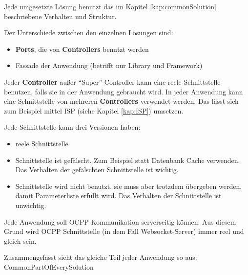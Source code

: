 Jede umgesetzte Lösung benutzt das im Kapitel \ref{kap:commonSolution} beschriebene Verhalten und Struktur. 

Der Unterschiede zwischen den einzelnen Lösungen sind:
\begin{itemize}
    \item \textbf{Ports}, die von \textbf{Controllers} benutzt werden
    \item Fassade der Anwendung (betrifft nur Library und Framework)
\end{itemize}

Jeder \textbf{Controller} außer ``Super''-Controller kann eine reele Schnittstelle benutzen, 
falls sie in der Anwendung gebraucht wird. In jeder Anwendung kann eine Schnittstelle von mehreren \textbf{Controllers} verwendet werden.
Das lässt sich zum Beispiel mittel ISP (siehe Kapitel \ref{kap:ISP}) umsetzen.

Jede Schnittstelle kann drei Versionen haben:
\begin{itemize}
    \item reele Schnittstelle
    \item Schnittstelle ist gefälscht. Zum Beispiel statt Datenbank Cache verwenden. Das Verhalten der gefälschten Schnittstelle ist wichtig.
    \item Schnittstelle wird nicht benutzt, sie muss aber trotzdem übergeben werden, 
    damit Parameterliste erfüllt wird. Das Verhalten der Schnittstelle ist unwichtig.
\end{itemize}

\newpage
Jede Anwendung soll OCPP Kommunikation serverseitig können. 
Aus diesem Grund wird OCPP Schnittstelle (in dem Fall Websocket-Server) immer reel und gleich sein.

Zusammengefasst sieht das gleiche Teil jeder Anwendung so aus:
{CommonPartOfEverySolution}